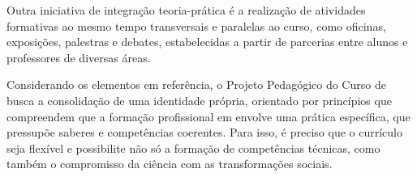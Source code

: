 Outra iniciativa de integração teoria-prática é a realização de atividades formativas ao mesmo tempo transversais e paralelas ao curso, como oficinas, exposições, palestras e debates, estabelecidas a partir de parcerias entre alunos e professores de diversas áreas.

Considerando os elementos em referência, o Projeto Pedagógico do Curso de \nomedocurso busca a consolidação de uma identidade própria, orientado por princípios que compreendem que a formação profissional em \nomedocurso envolve uma prática específica, que pressupõe saberes e competências coerentes. Para isso, é preciso que o currículo seja flexível e possibilite não só a formação de competências técnicas, como também o compromisso da ciência com as transformações sociais.